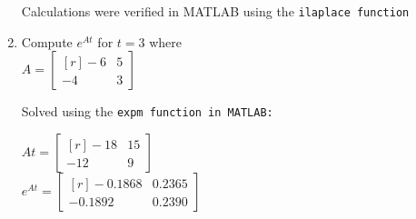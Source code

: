 \documentclass[11pt, oneside, letter]{article}
\begin{document}
\begin{enumerate}
	\flushleft 
	\vspace{2ex}
	Calculations were verified in MATLAB using the \tt ilaplace \rm function \\
	
\vspace{6ex}
	
	\item Compute $e^{At}$ for $t = 3$ where \\
	\centering
	$A = \begin{bmatrix*}[r] -6 & 5 \\ -4 & 3
	\end{bmatrix*}$ \\ \vspace{2ex}
	
	\flushleft
	Solved using the \tt expm \rm function in MATLAB: \\ \vspace{2ex}
	
	\centering
	$At = \begin{bmatrix*}[r] -18 & 15 \\ -12 & 9
	\end{bmatrix*}$ \\
	\vspace{2ex}
	$e^{At} = \begin{bmatrix*}[r] -0.1868 & 0.2365 \\ -0.1892 & 0.2390
	\end{bmatrix*}$ \\
	
	
	\end{enumerate}
\end{document}

